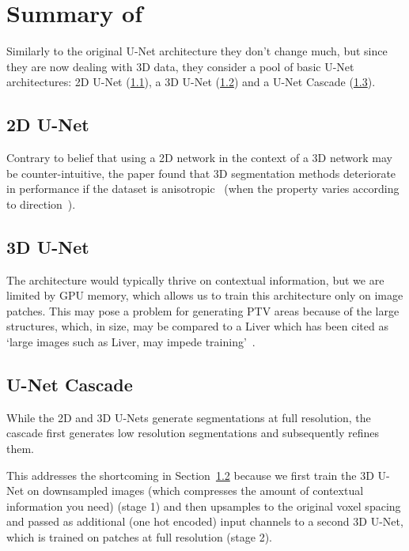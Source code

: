 \documentclass[11pt]{article}
\begin{document}


\tableofcontents

\clearpage

\section{Summary of~\cite{nnunet}}

Similarly to the original U-Net architecture they don't change much, but since they are now dealing with 3D data, they consider a pool of basic U-Net architectures: 2D U-Net (\ref{sec:2d-u-net}), a 3D U-Net (\ref{sec:3d-u-net}) and a U-Net Cascade (\ref{sec:u-net-cascade}).

\subsection{2D U-Net}\label{sec:2d-u-net}

Contrary to belief that using a 2D network in the context of a 3D network may be counter-intuitive, the paper found that 3D segmentation methods deteriorate in performance if the dataset is anisotropic~\cite{nnunet} (when the property varies according to direction~\cite{anisotropy}).

\subsection{3D U-Net}\label{sec:3d-u-net}

The architecture would typically thrive on contextual information, but we are limited by GPU memory, which allows us to train this architecture only on image patches. This may pose a problem for generating PTV areas because of the large structures, which, in size, may be compared to a Liver which has been cited as `large images such as Liver, may impede training'~\cite{nnunet}.

\subsection{U-Net Cascade}\label{sec:u-net-cascade}

While the 2D and 3D U-Nets generate segmentations at full resolution, the cascade first generates low resolution segmentations and subsequently refines them.

This addresses the shortcoming in Section~\ref{sec:3d-u-net} because we first train the 3D U-Net on downsampled images (which compresses the amount of contextual information you need) (stage 1) and then upsamples to the original voxel spacing and passed as additional (one hot encoded) input channels to a second 3D U-Net, which is trained on patches at full resolution (stage 2).
\end{document}
